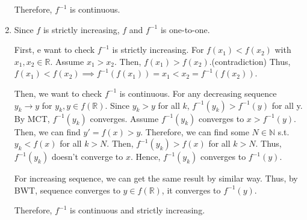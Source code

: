 \documentclass[12pt]{article}
\begin{document}
\begin{enumerate}
    Therefore, $f^{-1}$ is continuous.
    
    \newpage
    \item Since $f$ is strictly increasing, $f$ and $f^{-1}$ is one-to-one.
    
    First, e want to check $f^{-1}$ is strictly increasing.
    For $f(x_1) < f(x_2)$ with $x_1, x_2 \in \mathbb{R}$.
    Assume $x_1 > x_2$.
    Then, $f(x_1) > f(x_2)$.(contradiction)
    Thus, $f(x_1) < f(x_2)\implies f^{-1}(f(x_1))=x_1 < x_2 = f^{-1}(f(x_2))$.
    
    Then, we want to check $f^{-1}$ is continuous.
    For any decreasing sequence $y_k\to y$ for $y_k, y\in f(\mathbb{R})$.
    Since $y_k > y$ for all $k$, $f^{-1}(y_k) > f^{-1}(y)$ for all y.
    By MCT, $f^{-1}(y_k)$ converges.
    Assume $f^{-1}(y_k)$ converges to $x > f^{-1}(y)$.
    Then, we can find $y' = f(x) > y$.
    Therefore, we can find some $N\in \mathbb{N}$ s.t. $y_k< f(x)$ for all $k > N$.
    Then, $f^{-1}(y_k) > f(x)$ for all $k > N$.
    Thus, $f^{-1}(y_k)$ doesn't converge to $x$.
    Hence, $f^{-1}(y_k)$ converges to $f^{-1}(y)$.

    For increasing sequence, we can get the same result by similar way.
    Thus, by BWT, sequence converges to $y\in f(\mathbb{R})$, it converges to $f^{-1}(y)$.
    
    Therefore, $f^{-1}$ is continuous and strictly increasing.
    
\end{enumerate}
\end{document}
